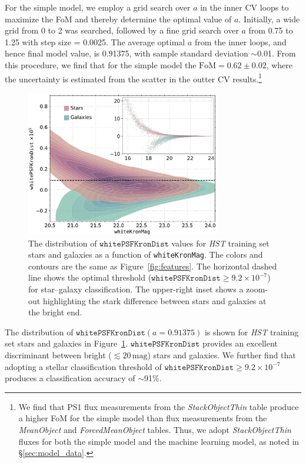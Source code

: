 \documentclass[twocolumn, dvipdfmx]{aastex62}
\begin{document}
For the simple model, we employ a grid search over $a$ in the inner CV loops
to maximize the FoM and thereby determine the optimal value of $a$.
Initially, a wide grid from 0 to 2 was searched, followed by a fine grid
search over $a$ from 0.75 to 1.25 with step size = 0.0025. The average
optimal $a$ from the inner loops, and hence final model value, is 0.91375,
with sample standard deviation $\sim$0.01. From this procedure, we find that
for the simple model the $\mathrm{FoM} = 0.62 \pm 0.02$, where the
uncertainty is estimated from the scatter in the outter CV
results.\footnote{We find that PS1 flux measurements from the
\textit{StackObjectThin} table produce a higher FoM for the simple model
than flux measurements from the \textit{MeanObject} and
\textit{ForcedMeanObject} tables. Thus, we adopt \textit{StackObjectThin}
fluxes for both the simple model and the machine learning model, as noted in
\S\ref{sec:model_data}.}


\begin{figure}[t]
 \centering
  \includegraphics[width=3.35in]{./Figures/whitePSFKronDist.pdf}
  \caption{ The distribution of $\mathtt{whitePSFKronDist}$ values for
  \textit{HST} training set stars and galaxies as a function of
  \texttt{whiteKronMag}. The colors and contours are the same as
  Figure~\ref{fig:features}. The horizontal dashed line shows the optimal
  threshold ($\mathtt{whitePSFKronDist} \ge 9.2 \times 10^{-7}$) for
  star--galaxy classification. The upper-right inset shows a zoom-out
  highlighting the stark difference between stars and galaxies at the bright
  end. }
  \label{fig:psfkrondist}
\end{figure}

The distribution of $\mathtt{whitePSFKronDist}(a=0.91375)$ is shown for
\textit{HST} training set stars and galaxies in
Figure~\ref{fig:psfkrondist}. $\mathtt{whitePSFKronDist}$ provides an
excellent discriminant between bright ($\lesssim 20\,\mathrm{mag}$) stars
and galaxies. We further find that adopting a stellar classification
threshold of $\mathtt{whitePSFKronDist} \ge 9.2 \times 10^{-7}$ produces a
classification accuracy of $\sim$91\%.
\end{document}
